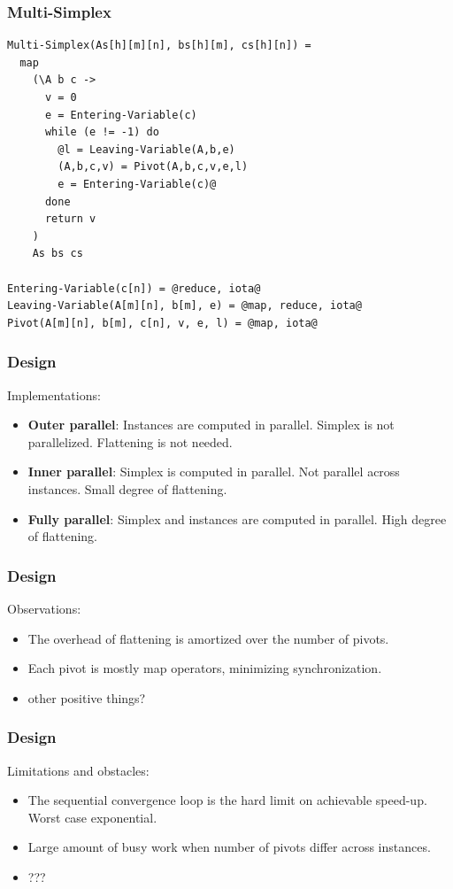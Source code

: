 \documentclass{beamer}
\begin{document}

\begin{frame}[fragile]
\frametitle{Multi-Simplex}
\begin{lstlisting}
Multi-Simplex(As[h][m][n], bs[h][m], cs[h][n]) =
  map
    (\A b c ->
      v = 0
      e = Entering-Variable(c)
      while (e != -1) do
        @l = Leaving-Variable(A,b,e)
        (A,b,c,v) = Pivot(A,b,c,v,e,l)
        e = Entering-Variable(c)@
      done
      return v
    )
    As bs cs

Entering-Variable(c[n]) = @reduce, iota@
Leaving-Variable(A[m][n], b[m], e) = @map, reduce, iota@
Pivot(A[m][n], b[m], c[n], v, e, l) = @map, iota@
\end{lstlisting}
\end{frame}

\begin{frame}
\frametitle{Design}
Implementations:
\begin{itemize}
	\item \textbf{Outer parallel}: Instances are computed in parallel. Simplex is not parallelized. Flattening is not needed.
	
	\item \textbf{Inner parallel}: Simplex is computed in parallel. Not parallel across instances. Small degree of flattening.
	
	\item \textbf{Fully parallel}: Simplex and instances are computed in parallel. High degree of flattening.
\end{itemize}
\end{frame}

\begin{frame}
\frametitle{Design}
Observations:
\begin{itemize}
	\item The overhead of flattening is amortized over the number of pivots.
	
	\item Each pivot is mostly map operators, minimizing synchronization.
	
	\item other positive things?
\end{itemize}
\end{frame}

\begin{frame}
\frametitle{Design}
Limitations and obstacles:
\begin{itemize}
	\item The sequential convergence loop is the hard limit on achievable speed-up. Worst case exponential. 
	
	\item Large amount of busy work when number of pivots differ across instances.
	
	\item ???
\end{itemize}
\end{frame}
\end{document}
